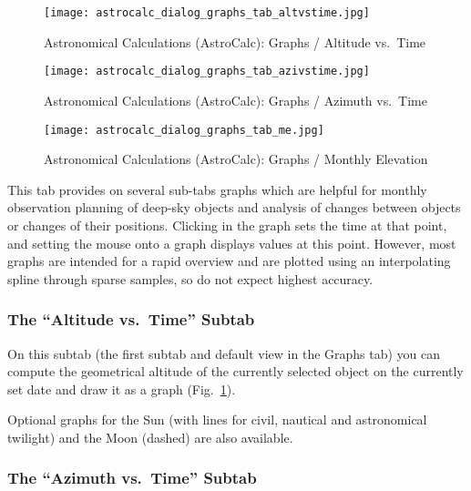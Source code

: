 \begin{figure}[p]
\centering\texttt{[image: astrocalc\_dialog\_graphs\_tab\_altvstime.jpg]}
\caption{Astronomical Calculations (AstroCalc): Graphs / Altitude vs.\ Time}
\label{fig:gui:AstroCalc:Graphs:AltVsTime}
\end{figure}
\begin{figure}[p]
\centering\texttt{[image: astrocalc\_dialog\_graphs\_tab\_azivstime.jpg]}
\caption{Astronomical Calculations (AstroCalc): Graphs / Azimuth vs.\ Time}
\label{fig:gui:AstroCalc:Graphs:AziVsTime}
\end{figure}
\begin{figure}[p]
\centering\texttt{[image: astrocalc\_dialog\_graphs\_tab\_me.jpg]}
\caption{Astronomical Calculations (AstroCalc): Graphs / Monthly Elevation}
\label{fig:gui:AstroCalc:Graphs:ME}
\end{figure}


This tab provides on several sub-tabs
 graphs which are helpful for monthly observation
planning of deep-sky objects and analysis of changes between objects
or changes of their positions. Clicking  in the
graph sets the time at that point, and setting the mouse onto a graph
displays values at this point. However, most graphs are intended for a
rapid overview and are plotted using an interpolating spline through sparse samples,
so do not expect highest accuracy. 

\subsubsection{The ``Altitude vs.\ Time'' Subtab}
\label{sec:gui:AstroCalc:Graphs:AltVsTime}
  
On this subtab (the first subtab and default view in the Graphs tab) you can compute the geometrical altitude of the currently selected object 
on the currently set date and draw it as a graph (Fig.~\ref{fig:gui:AstroCalc:Graphs:AltVsTime}).

Optional graphs for the Sun (with lines for civil, nautical and astronomical twilight) and the Moon (dashed) are also available.

\subsubsection{The ``Azimuth vs.\ Time'' Subtab}
\label{sec:gui:AstroCalc:Graphs:AziVsTime}
  
